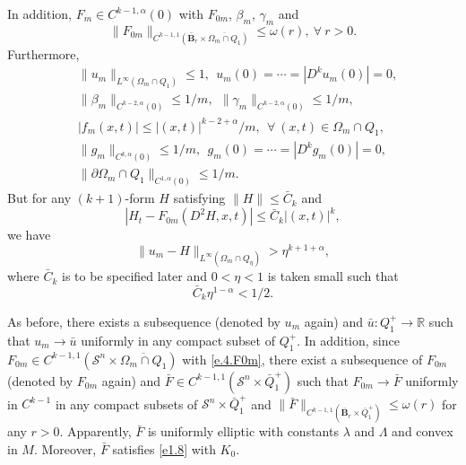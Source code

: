 \documentclass[preprint,12pt]{elsarticle}
\theoremstyle{definition}
\theoremstyle{remark}
\numberwithin{equation}{section}
\begin{document}
In addition, $F_m \in C^{k-1,\alpha}(0)$ with $F_{0m}$, $\beta_m$, $\gamma_m$ and
\begin{equation}\label{e.4.F0m}
\|F_{0m}\|_{C^{k-1,1}(\bar{\textbf{B}}_r\times \overline{\Omega_m\cap Q_1})}\leq \omega(r),~\forall ~r>0.
\end{equation}
Furthermore,
\begin{equation*}
  \begin{aligned}
    &\|u_m\|_{L^{\infty}(\Omega_m\cap Q_1)}\leq 1,~~ u_m(0)=\cdots=|D^ku_m(0)|=0,\\
    &\|\beta_m\|_{C^{k-2,\alpha}(0)}\leq 1/m,~~
    \|\gamma_m\|_{C^{k-2,\alpha}(0)}\leq 1/m,\\
    &|f_m(x,t)|\leq |(x,t)|^{k-2+\alpha}/m,~~\forall ~(x,t)\in \Omega_m\cap Q_1,\\
    &\|g_m\|_{C^{k,\alpha}(0)}\leq 1/m,~~g_m(0)=\cdots=|D^kg_m(0)|=0,\\
    &\|\partial \Omega_m\cap Q_1\|_{C^{1,\alpha}(0)} \leq 1/m.
  \end{aligned}
\end{equation*}
But for any $(k+1)$-form $H$ satisfying $\|H\|\leq \bar{C}_k$ and
\begin{equation}\label{e.L.Cka.Q}
 \left|H_t-F_{0m}(D^2H,x,t)\right|\leq \bar{C}_k|(x,t)|^{k},
\end{equation}
we have
\begin{equation}\label{e.L.Cka.1}
  \|u_m-H\|_{L^{\infty}(\Omega_{m}\cap Q_{\eta})}> \eta^{k+1+\alpha},
\end{equation}
where $\bar{C}_k$ is to be specified later and $0<\eta<1$ is taken small such that
\begin{equation}\label{e.L.Cka.2}
\bar{C}_k\eta^{1-\alpha}<1/2.
\end{equation}

As before, there exists a subsequence (denoted by $u_m$ again) and $\bar u: Q_1^+\rightarrow \mathbb R$ such that $u_m\rightarrow \bar u$ uniformly in any compact subset of $Q^+_1$. In addition, since $F_{0m}\in C^{k-1,1}(\mathcal{S}^{n}\times \overline{\Omega_m\cap Q_1})$ with \cref{e.4.F0m}, there exist a subsequence of $F_{0m}$ (denoted by $F_{0m}$ again) and $\bar F\in C^{k-1,1}(\mathcal{S}^{n}\times \bar{Q}_1^+)$ such that $F_{0m}\rightarrow \bar F$ uniformly in $C^{k-1}$ in any compact subsets of $\mathcal {S}^{n}\times \bar{Q}^+_1$ and $\|\bar F\|_{C^{k-1,1}(\bar{\textbf{B}}_r\times \bar{Q}_1^+)}\leq \omega(r)$ for any $r>0$. Apparently, $\bar F$ is uniformly elliptic with constants $\lambda$ and $\Lambda$ and convex in $M$. Moreover, $\bar F$ satisfies \cref{e1.8} with $K_0$.
\end{document}
